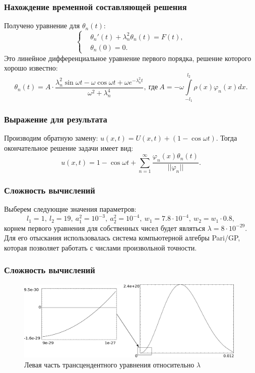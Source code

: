 \documentclass[10pt,pdf,hyperref={unicode}]{beamer}
\begin{document}
\begin{frame}
  \frametitle{Нахождение временной составляющей решения}
  Получено уравнение для $\theta_n(t)$:
  \begin{equation*}
    \left\{  
    \begin{aligned}
      & \theta_n'(t) + \lambda_n^2 \theta_n(t) = F(t), \\
      & \theta_n (0) = 0.
    \end{aligned}
    \right.
  \end{equation*}
  Это линейное дифференциальное уравнение первого порядка, решение которого хорошо известно:
  \begin{equation*}
    \theta_n(t) = A\cdot\frac{\lambda_n^2 \sin \omega t - \omega \cos \omega t + \omega e^{-\lambda_n^2 t}}{\omega^2 + \lambda_n^4},\ \text{где}\ A=-\omega\int\limits_{-l_1}^{l_2}\rho(x)\varphi_n(x)dx.
  \end{equation*}
\end{frame}

\begin{frame}
  \frametitle{Выражение для результата}
    Производим обратную замену: $u(x,t) = U(x,t) + (1 - \cos \omega t)$. Тогда окончательное решение задачи имеет вид:
    \begin{equation}
      u(x,t)= 1 - \cos \omega t + \sum \limits_{n=1}^{\infty} \frac{\varphi_n(x) \theta_n(t)}{||\varphi_n||}.
    \end{equation}
\end{frame}

\begin{frame}
  \frametitle{Сложность вычислений}
    Выберем следующие значения параметров:
    \begin{equation*}
      l_1=1,\ l_2=19,\ a_1^2=10^{-3},\ a_2^2=10^{-4},\ w_1=7.8\cdot 10^{-4},\ w_2=w_1 \cdot 0.8,
    \end{equation*}
    корнем первого уравнения для собственных чисел будет являться $\lambda=8 \cdot 10^{-29}$.
    Для его отыскания использовалась система компьютерной алгебры Pari/GP, 
    которая позволяет работать с числами произвольной точности.
\end{frame}

\begin{frame}
  \frametitle{Сложность вычислений}
  \begin{figure}[H]
   \includegraphics[width=11cm]{full.eps}
   \caption{Левая часть трансцендентного уравнения относительно $\lambda$}
  \end{figure}
\end{frame}
\end{document}
